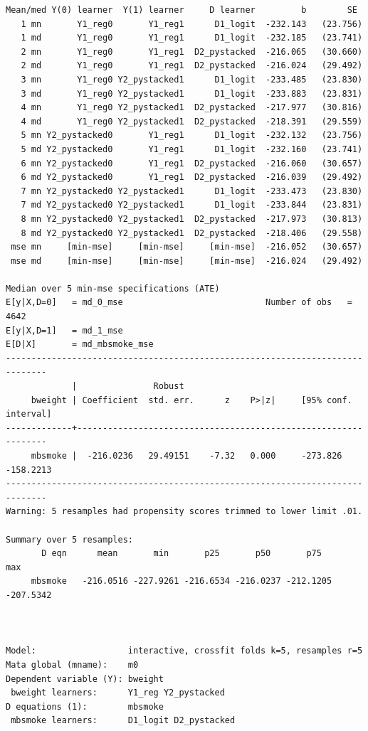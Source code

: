\documentclass[
]{book}
\begin{document}
\begin{verbatim}
Mean/med Y(0) learner  Y(1) learner     D learner         b        SE 
   1 mn       Y1_reg0       Y1_reg1      D1_logit  -232.143   (23.756)
   1 md       Y1_reg0       Y1_reg1      D1_logit  -232.185   (23.741)
   2 mn       Y1_reg0       Y1_reg1  D2_pystacked  -216.065   (30.660)
   2 md       Y1_reg0       Y1_reg1  D2_pystacked  -216.024   (29.492)
   3 mn       Y1_reg0 Y2_pystacked1      D1_logit  -233.485   (23.830)
   3 md       Y1_reg0 Y2_pystacked1      D1_logit  -233.883   (23.831)
   4 mn       Y1_reg0 Y2_pystacked1  D2_pystacked  -217.977   (30.816)
   4 md       Y1_reg0 Y2_pystacked1  D2_pystacked  -218.391   (29.559)
   5 mn Y2_pystacked0       Y1_reg1      D1_logit  -232.132   (23.756)
   5 md Y2_pystacked0       Y1_reg1      D1_logit  -232.160   (23.741)
   6 mn Y2_pystacked0       Y1_reg1  D2_pystacked  -216.060   (30.657)
   6 md Y2_pystacked0       Y1_reg1  D2_pystacked  -216.039   (29.492)
   7 mn Y2_pystacked0 Y2_pystacked1      D1_logit  -233.473   (23.830)
   7 md Y2_pystacked0 Y2_pystacked1      D1_logit  -233.844   (23.831)
   8 mn Y2_pystacked0 Y2_pystacked1  D2_pystacked  -217.973   (30.813)
   8 md Y2_pystacked0 Y2_pystacked1  D2_pystacked  -218.406   (29.558)
 mse mn     [min-mse]     [min-mse]     [min-mse]  -216.052   (30.657)
 mse md     [min-mse]     [min-mse]     [min-mse]  -216.024   (29.492)

Median over 5 min-mse specifications (ATE)
E[y|X,D=0]   = md_0_mse                            Number of obs   =      4642
E[y|X,D=1]   = md_1_mse
E[D|X]       = md_mbsmoke_mse
------------------------------------------------------------------------------
             |               Robust
     bweight | Coefficient  std. err.      z    P>|z|     [95% conf. interval]
-------------+----------------------------------------------------------------
     mbsmoke |  -216.0236   29.49151    -7.32   0.000     -273.826   -158.2213
------------------------------------------------------------------------------
Warning: 5 resamples had propensity scores trimmed to lower limit .01.

Summary over 5 resamples:
       D eqn      mean       min       p25       p50       p75       max
     mbsmoke   -216.0516 -227.9261 -216.6534 -216.0237 -212.1205 -207.5342



Model:                  interactive, crossfit folds k=5, resamples r=5
Mata global (mname):    m0
Dependent variable (Y): bweight
 bweight learners:      Y1_reg Y2_pystacked
D equations (1):        mbsmoke
 mbsmoke learners:      D1_logit D2_pystacked


\end{verbatim}
\end{document}
